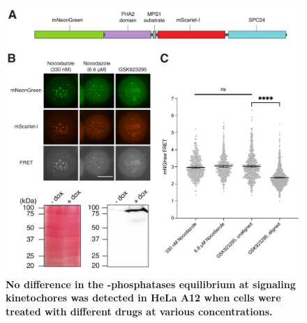 \begin{figure} [b!]
    \centering
    \includegraphics[width=\textwidth]{chapters/figures/MPS1sen-KT.pdf}
    \caption{\textbf{No difference in the -phosphatases equilibrium at signaling kinetochores was detected in HeLa A12 when cells were treated with different drugs at various concentrations.}}
    \label{MPS1sen-KT}
\end{figure}
